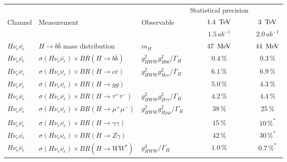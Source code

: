\begin{table}
  \centering
  \begin{tabular}{lllcc}\toprule
    &                                                           &                              & Statistical precision                       \\\cmidrule(l){4-5}
    Channel  & Measurement                                        & Observable & $1.4\,\TeV$         & $3\,\TeV$           \\ 
    &                                                           &                           & $1.5\,ab^{-1}$      & $2.0\,ab^{-1}$        \\ \midrule
    $H\nu_e\bar{\nu_e}$    & $H\rightarrow b\bar{b}$ mass distribution                       & $m_H$                & $47\,\MeV$     & $44\,\MeV$       \\ \midrule
    $H\nu_e\bar{\nu_e}$    & $\sigma(H\nu_e\bar{\nu_e})\times BR(H\rightarrow b\bar{b})$        & $g^{2}_{HWW}g_{Hbb}^{2}/\Gamma_H$   & $0.4\,\%$         & $0.3\,\%$           \\
    $H\nu_e\bar{\nu_e}$    & $\sigma(H\nu_e\bar{\nu_e})\times BR(H\rightarrow c\bar{c})$        & $g^{2}_{HWW}g_{Hcc}^{2}/\Gamma_H$  & $6.1\,\%$         & $6.9\,\%$           \\
    $H\nu_e\bar{\nu_e}$    & $\sigma(H\nu_e\bar{\nu_e})\times BR(H\rightarrow gg)$           &                     & $5.0\,\%$         & $4.3\,\%$           \\
    $H\nu_e\bar{\nu_e}$    & $\sigma(H\nu_e\bar{\nu_e})\times BR(H\rightarrow \tau^+\tau^-)$       & $g^{2}_{HWW}g_{H\tau\tau}^{2}/\Gamma_H$ & $4.2\,\%$         & $4.4\,\%$               \\
    $H\nu_e\bar{\nu_e}$    & $\sigma(H\nu_e\bar{\nu_e})\times BR(H\rightarrow \mu^+\mu^-)$       & $g^{2}_{HWW}g_{H\mu\mu}^{2}/\Gamma_H$   & $38\,\%$        & $25\,\%$            \\
    $H\nu_e\bar{\nu_e}$    & $\sigma(H\nu_e\bar{\nu_e})\times BR(H\rightarrow \gamma\gamma)$ &                          & $15\,\%$          & $10\,\%^*$               \\
    $H\nu_e\bar{\nu_e}$    & $\sigma(H\nu_e\bar{\nu_e})\times BR(H\rightarrow Z\gamma)$      &                             & $42\,\%$           & $30\,\%^*$               \\
    $H\nu_e\bar{\nu_e}$    & $\sigma(H\nu_e\bar{\nu_e})\times BR(H\rightarrow WW^*)$         & $g_{HWW}^{4}/\Gamma_H$            & $1.0\,\%$         & $0.7\,\%^*$         \\

\end{tabular}
\end{table}
